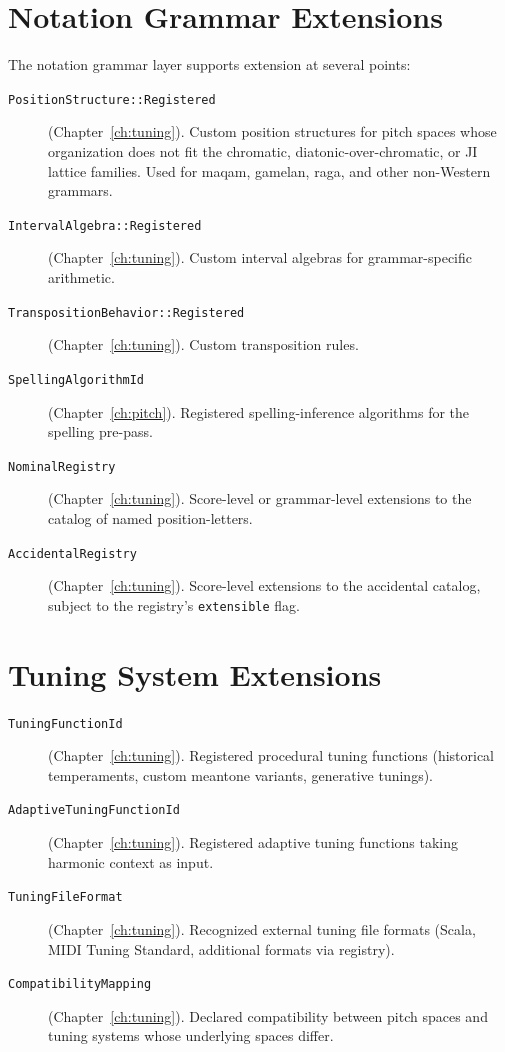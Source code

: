 \documentclass[11pt,letterpaper]{report}
\begin{document}
\section{Notation Grammar Extensions}
\label{sec:ext:grammar}

The notation grammar layer supports extension at several points:

\begin{description}
  \item[\texttt{PositionStructure::Registered}] (Chapter~\ref{ch:tuning}).
    Custom position structures for pitch spaces whose organization
    does not fit the chromatic, diatonic-over-chromatic, or JI
    lattice families. Used for maqam, gamelan, raga, and other
    non-Western grammars.
  \item[\texttt{IntervalAlgebra::Registered}] (Chapter~\ref{ch:tuning}).
    Custom interval algebras for grammar-specific arithmetic.
  \item[\texttt{TranspositionBehavior::Registered}]
    (Chapter~\ref{ch:tuning}). Custom transposition rules.
  \item[\texttt{SpellingAlgorithmId}] (Chapter~\ref{ch:pitch}).
    Registered spelling-inference algorithms for the spelling
    pre-pass.
  \item[\texttt{NominalRegistry}] (Chapter~\ref{ch:tuning}).
    Score-level or grammar-level extensions to the catalog of
    named position-letters.
  \item[\texttt{AccidentalRegistry}] (Chapter~\ref{ch:tuning}).
    Score-level extensions to the accidental catalog, subject to
    the registry's \texttt{extensible} flag.
\end{description}

\section{Tuning System Extensions}
\label{sec:ext:tuning}

\begin{description}
  \item[\texttt{TuningFunctionId}] (Chapter~\ref{ch:tuning}).
    Registered procedural tuning functions (historical
    temperaments, custom meantone variants, generative tunings).
  \item[\texttt{AdaptiveTuningFunctionId}] (Chapter~\ref{ch:tuning}).
    Registered adaptive tuning functions taking harmonic context as
    input.
  \item[\texttt{TuningFileFormat}] (Chapter~\ref{ch:tuning}).
    Recognized external tuning file formats (Scala, MIDI Tuning
    Standard, additional formats via registry).
  \item[\texttt{CompatibilityMapping}] (Chapter~\ref{ch:tuning}).
    Declared compatibility between pitch spaces and tuning systems
    whose underlying spaces differ.
\end{description}
\end{document}
